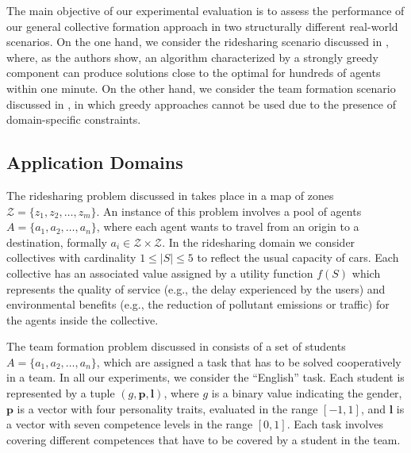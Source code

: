 \documentclass{article}
\theoremstyle{definition}
\begin{document}
The main objective of our experimental evaluation is to assess the performance of our general collective formation approach in two structurally different real-world scenarios. On the one hand, we consider the ridesharing scenario discussed in \cite{bistaffa2019computational}, where, as the authors show, an algorithm characterized by a strongly greedy component can produce solutions close to the optimal for hundreds of agents within one minute.
On the other hand, we consider the team formation scenario discussed in \cite{andrejczuk2019synergistic}, in which greedy approaches cannot be used due to the presence of domain-specific constraints. 

\subsection{Application Domains}%
\label{sec:case}

The ridesharing problem discussed in \cite{bistaffa2019computational} takes place in a map of zones $\mathcal{Z} = \{z_1, z_2, \ldots, z_m\}$. An instance of this problem involves a pool of agents $A = \{a_1, a_2, \ldots, a_n\}$, where each agent wants to travel from an origin to a destination, formally $a_i \in \mathcal{Z} \times \mathcal{Z}$. In the ridesharing domain we consider collectives with cardinality $1 \leq |S| \leq 5$ to reflect the usual capacity of cars. Each collective has an associated value assigned by a utility function $f(S)$ which represents the quality of service (e.g., the delay experienced by the users) and environmental benefits (e.g., the reduction of pollutant emissions or traffic) for the agents inside the collective.

The team formation problem discussed in \cite{andrejczuk2019synergistic} consists of a set of students $A = \{a_1, a_2, \ldots, a_n\}$, which are assigned a task that has to be solved cooperatively in a team. In all our experiments, we consider the ``English'' task.
Each student is represented by a tuple $(g, \boldsymbol{p}, \boldsymbol{l})$, where $g$ is a binary value indicating the gender, $\boldsymbol{p}$ is a vector with four personality traits, evaluated in the range $[-1, 1]$, and $\boldsymbol{l}$ is a vector with seven competence levels in the range $[0, 1]$. Each task involves covering different competences that have to be covered by a student in the team.
\end{document}
